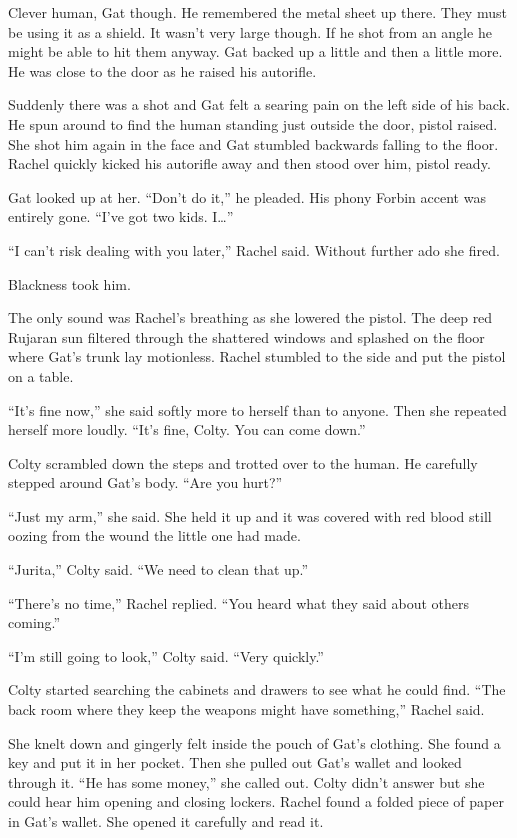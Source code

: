 Clever human, Gat though. He remembered the metal sheet up there. They must be using it as a
shield. It wasn't very large though. If he shot from an angle he might be able to hit them
anyway. Gat backed up a little and then a little more. He was close to the door as he raised his
autorifle.

Suddenly there was a shot and Gat felt a searing pain on the left side of his back. He spun
around to find the human standing just outside the door, pistol raised. She shot him again in the
face and Gat stumbled backwards falling to the floor. Rachel quickly kicked his autorifle away
and then stood over him, pistol ready.

Gat looked up at her. ``Don't do it,'' he pleaded. His phony Forbin accent was entirely gone.
``I've got two kids. I\ldots''

``I can't risk dealing with you later,'' Rachel said. Without further ado she fired.

Blackness took him.

\breakpoint

The only sound was Rachel's breathing as she lowered the pistol. The deep red Rujaran sun
filtered through the shattered windows and splashed on the floor where Gat's trunk lay
motionless. Rachel stumbled to the side and put the pistol on a table.

``It's fine now,'' she said softly more to herself than to anyone. Then she repeated herself
more loudly. ``It's fine, Colty. You can come down.''

Colty scrambled down the steps and trotted over to the human. He carefully stepped around Gat's
body. ``Are you hurt?''

``Just my arm,'' she said. She held it up and it was covered with red blood still oozing from
the wound the little one had made.

``Jurita,'' Colty said. ``We need to clean that up.''

``There's no time,'' Rachel replied. ``You heard what they said about others coming.''

``I'm still going to look,'' Colty said. ``Very quickly.''

Colty started searching the cabinets and drawers to see what he could find. ``The back room
where they keep the weapons might have something,'' Rachel said.

She knelt down and gingerly felt inside the pouch of Gat's clothing. She found a key and put it
in her pocket. Then she pulled out Gat's wallet and looked through it. ``He has some money,''
she called out. Colty didn't answer but she could hear him opening and closing lockers. Rachel
found a folded piece of paper in Gat's wallet. She opened it carefully and read it.

